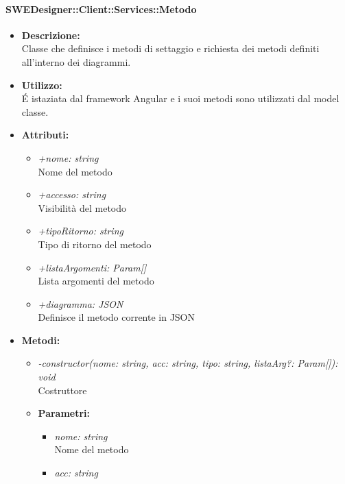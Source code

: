           	\paragraph{SWEDesigner::Client::Services::Metodo}
				\begin{itemize}
          			\item \textbf{Descrizione:}\\
          			Classe che definisce i metodi di settaggio e richiesta dei metodi definiti all’interno dei diagrammi.
          			\item \textbf{Utilizzo:}\\
          			É istaziata dal framework Angular e i suoi metodi sono utilizzati dal model classe.
          			\item \textbf{Attributi:}\\
          			\begin{itemize}
          				\item \emph{+nome: string}\\
            			Nome del metodo
            			\item \emph{+accesso: string}\\
            			Visibilità del metodo
            			\item \emph{+tipoRitorno: string}\\
            			Tipo di ritorno del metodo
            			\item \emph{+listaArgomenti: Param[]}\\
            			Lista argomenti del metodo
            			\item \emph{+diagramma: JSON}\\
            			Definisce il metodo corrente in JSON
          			\end{itemize}
          			\item \textbf{Metodi:}\\
          			\begin{itemize}
          				\item \emph{-constructor(nome: string, acc: string, tipo: string, listaArg?: Param[]): void}\\
          				Costruttore
          				\item \textbf{Parametri:}\\
            				\begin{itemize}
            					\item \emph{nome: string}\\
            					Nome del metodo
            					\item \emph{acc: string}\\

\end{itemize}
\end{itemize}
\end{itemize}
